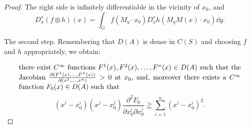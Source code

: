 \begin{proof}
The right side is infinitely differentiable in the vicinity of $x_{0}$, and 
\begin{equation}\label{eq:XIII.5.10}
D _{x} ^{s} (f \otimes h) (x) = \int_{G} f \left(M _{y} \cdot x _{0}\right) D _{x} ^{s} h \left(M _{y} M (x) \cdot x _{0}\right) \dd y.
\end{equation}

The second step. Remembering that $D(A)$ is dense in $C(S)$ and choosing $f$ and $h$ appropriately, we obtain: 

\begin{equation}\label{eq:XIII.5.11}
\parbox{0.92\linewidth}{\everymath{}\let\limits\nolimits there exist $C^\infty$ functions $F^1(x), F^2(x), \ldots, F^n(x) \in D(A)$ such that the Jacobian $\frac{\partial(F^1(x),\ldots,F^n(x))}{\partial(x^1,\ldots,x^n)} >0$ at $x_0$, and, moreover there exists a $C^\infty$ function $F_0(x) \in D(A)$ such that}
\end{equation}
\begin{equation}\label{eq:XIII.5.12}
\left(x ^{i} - x _{0} ^{i}\right) \left(x ^{j} - x _{0} ^{j}\right) \frac {\partial^{2} F _{0}}{\partial x _{0} ^{i} \partial x _{0} ^{j}} \geqq \sum\limits_{i=1} ^{n} \left(x ^{i} - x _{0} ^{i}\right) ^{2}.
\end{equation}


\end{proof}

